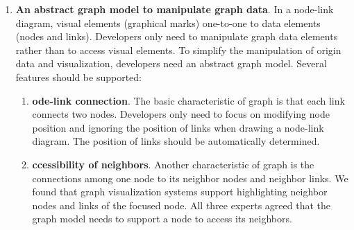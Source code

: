 \begin{enumerate}[label*=\textbf{R\arabic*}] %
\item 
        \textbf{An abstract graph model to manipulate graph data}.
        In a node-link diagram, visual elements (graphical marks)  one-to-one  to data elements (nodes and links).  Developers only need to manipulate graph data elements rather than to access visual elements.
        To simplify the manipulation of origin data and visualization, developers need an abstract graph model. Several features should be supported:
    \label{R:model}
\begin{enumerate}[label*=\textbf{.\arabic*}]
    \item 
        \textbf{ode-link connection}.
        The basic characteristic of graph is that each link connects two nodes.
        Developers only need to focus on modifying node position and ignoring the position of links when drawing a node-link diagram. 
        The position of links should be automatically determined.
    \label{R:connection}
    \item 
        \textbf{ccessibility of neighbors}.
        Another characteristic of graph is the connections among one node to its neighbor nodes and neighbor links.
        We found that  graph visualization systems support highlighting  neighbor nodes and links of the focused node. All three experts agreed that the graph model needs to support a node to access its neighbors.
    \label{R:neighbors}

\end{enumerate}
\end{enumerate}
